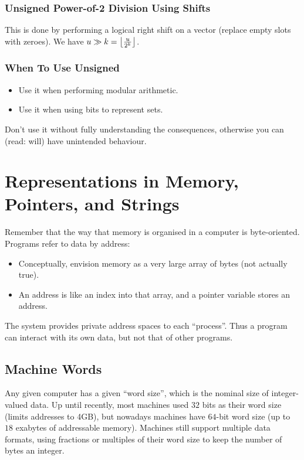 \documentclass[class=article, crop=false]{standalone}
\begin{document}
  \subsubsection{Unsigned Power-of-2 Division Using Shifts}
  This is done by performing a logical right shift on a vector (replace empty slots with zeroes). We have $u\gg k = \left\lfloor \frac{u}{2^k} \right\rfloor$.
  \subsubsection{When To Use Unsigned}
  \begin{itemize}
    \item Use it when performing modular arithmetic.
    \item Use it when using bits to represent sets.
  \end{itemize}
  \begin{note}{}
    Don't use it without fully understanding the consequences, otherwise you can (read: will) have unintended behaviour.
  \end{note}
  \section{Representations in Memory, Pointers, and Strings}
  Remember that the way that memory is organised in a computer is byte-oriented. \\[10pt]
  Programs refer to data by address:
  \begin{itemize}
    \item Conceptually, envision memory as a very large array of bytes (not actually true).
    \item An address is like an index into that array, and a pointer variable stores an address.
  \end{itemize}
  \begin{note}{}
    The system provides private address spaces to each ``process''. Thus a program can interact with its own data, but not that of other programs.
  \end{note}
  \subsection{Machine Words}
  Any given computer has a given ``word size'', which is the nominal size of integer-valued data. Up until recently, most machines used $32$ bits as their word size (limits addresses to 4GB), but nowadays machines have $64$-bit word size (up to $18$ exabytes of addressable memory). Machines still support multiple data formats, using fractions or multiples of their word size to keep the number of bytes an integer.
\end{document}
